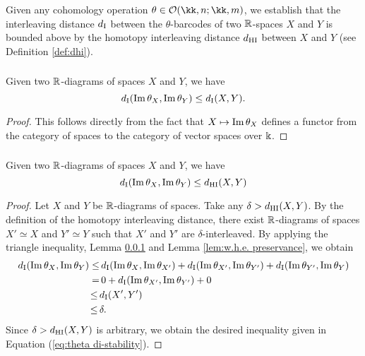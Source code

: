 Given any cohomology operation $\theta \in \cO(\kk, n; \kk, m)$, we establish that the interleaving distance $d_{\mathrm{I}}$ between the $\theta$-barcodes of two $\mathbb{R}$-spaces $X$ and $Y$ is bounded above by the homotopy interleaving distance $d_{\mathrm{HI}}$ between $X$ and $Y$ (see Definition \ref{def:dhi}).


\subsubsection{}\label{lem:di stability}

\lemma Given two $\mathbb{R}$-diagrams of spaces $X$ and $Y$, we have
\[
d_{\mathrm{I}}(\operatorname{Im}\theta_{X}, \operatorname{Im}\theta_{Y}) \leq d_{\mathrm{I}}(X,Y).
\]

\begin{proof}
	This follows directly from the fact that $X \mapsto \operatorname{Im}\theta_{X}$ defines a functor from the category of spaces to the category of vector spaces over $\Bbbk$.
\end{proof}

\subsubsection{}\label{thm:theta stability}

\theorem Given two $\mathbb{R}$-diagrams of spaces $X$ and $Y$, we have
\begin{equation}\label{eq:theta di-stability}
	d_{\mathrm{I}}(\operatorname{Im}\theta_{X}, \operatorname{Im}\theta_{Y})\leq d_{\mathrm{HI}}(X,Y)
\end{equation}

\begin{proof}
	Let $X$ and $Y$ be $\mathbb{R}$-diagrams of spaces. 
	Take any $\delta > d_{\mathrm{HI}}(X,Y)$.
	By the definition of the homotopy interleaving distance, there exist $\mathbb{R}$-diagrams of spaces $X' \simeq X$ and $Y' \simeq Y$ such that $X'$ and $Y'$ are $\delta$-interleaved.
	By applying the triangle inequality, Lemma \ref{lem:di stability} and Lemma \ref{lem:w.h.e. preservance}, we obtain
	\begin{align*}
		d_{\mathrm{I}}(\operatorname{Im}\theta_{X}, \operatorname{Im}\theta_{Y}) \leq& \,
		d_{\mathrm{I}}(\operatorname{Im}\theta_{X}, \operatorname{Im}\theta_{X'}) + d_{\mathrm{I}}(\operatorname{Im}\theta_{X'}, \operatorname{Im}\theta_{Y'}) + d_{\mathrm{I}}(\operatorname{Im}\theta_{Y'}, \operatorname{Im}\theta_{Y}) \\ =& \, 
		0 + d_{\mathrm{I}}(\operatorname{Im}\theta_{X'}, \operatorname{Im}\theta_{Y'}) + 0 \\ \leq \,&
		d_{\mathrm{I}}(X',Y') \\ \leq \,&
		\delta.
	\end{align*}
	Since $\delta > d_{\mathrm{HI}}(X,Y)$ is arbitrary, we obtain the desired inequality given in Equation (\ref{eq:theta di-stability}).
\end{proof}


